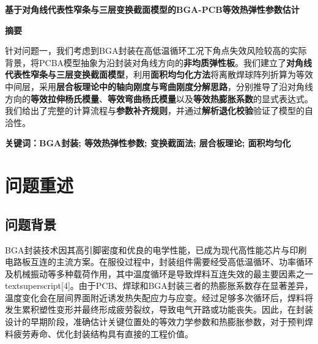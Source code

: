 \documentclass[draft,12pt,a4paper]{ctexart}
\theoremstyle{definition}
\begin{document}
\newcommand{\keywords}[1]{\par\vspace{6pt}\noindent\textbf{关键词：#1}\par}
\renewcommand{\lstlistingname}{代码}

\begin{center}
  {\bfseries 基于\textbf{对角线代表性窄条与三层变换截面模型}的BGA-PCB\textbf{等效热弹性参数}估计\par}
\end{center}

\begin{center}
  {\bfseries \textbf{摘\quad 要}}
\end{center}
\vspace{0.1cm}

针对问题一，我们考虑到BGA封装在高低温循环工况下角点失效风险较高的实际背景，将PCBA模型抽象为沿封装对角线方向的\textbf{非均质弹性板}。我们建立了\textbf{对角线代表性窄条与三层变换截面模型}，利用\textbf{面积均匀化方法}将离散焊球阵列折算为等效中间层，采用\textbf{层合板理论中的轴向刚度与弯曲刚度分解思路}，分别推导了沿对角线方向的\textbf{等效拉伸杨氏模量}、\textbf{等效弯曲杨氏模量}以及\textbf{等效热膨胀系数}的显式表达式。我们给出了完整的计算流程与\textbf{参数补齐规则}，并通过\textbf{解析退化校验}验证了模型的自洽性。

\vspace{6pt}
\keywords{BGA封装; \textbf{等效热弹性参数}; \textbf{变换截面法}; \textbf{层合板理论}; 面积均匀化}
\newpage

\section{问题重述}
\subsection{问题背景}

BGA封装技术因其高引脚密度和优良的电学性能，已成为现代高性能芯片与印刷电路板互连的主流方案。在服役过程中，封装组件需要经受高低温循环、功率循环及机械振动等多种载荷作用，其中温度循环是导致焊料互连失效的最主要因素之一\\textsuperscript{[4]}。由于PCB、焊球和BGA封装三者的热膨胀系数存在显著差异，温度变化会在层间界面附近诱发热失配应力与应变。经过足够多次循环后，焊料将发生累积塑性变形并最终形成疲劳裂纹，导致电气开路或功能丧失。因此，在封装设计的早期阶段，准确估计关键位置处的等效力学参数和热膨胀参数，对于预判焊料疲劳寿命、优化封装结构具有直接的工程价值。
\end{document}
